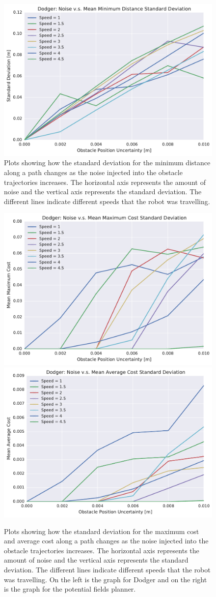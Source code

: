 \begin{figure}[h!]
    \centering

    \includegraphics[width=0.80\linewidth]{figs/planner_std_min_distance_1}

    \caption{Plots showing how the standard deviation for the minimum distance
        along a path changes as the noise injected into the obstacle
        trajectories increases. The horizontal axis represents the amount of
        noise and the vertical axis represents the standard deviation. The
        different lines indicate different speeds that the robot was
    travelling.}

\end{figure}

\begin{figure}[h!]
    \centering

    \includegraphics[width=0.48\linewidth]{figs/planner_std_max_cost_1}
    \includegraphics[width=0.48\linewidth]{figs/planner_std_avg_cost_1}

    \caption{Plots showing how the standard deviation for the maximum cost and
        average cost along a path changes as the noise injected into the
        obstacle trajectories increases. The horizontal axis represents the
        amount of noise and the vertical axis represents the standard
        deviation. The different lines indicate different speeds that the robot
        was travelling. On the left is the graph for Dodger and on the right is
    the graph for the potential fields planner.}

\end{figure}

